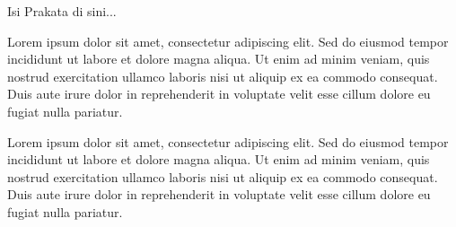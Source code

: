 \documentclass[skripsi,indonesia]{ugmskripsi}
\begin{document}
\cover
\titlepageind
\approvalpage
\declarepage
\motto
\acknowledment

\preface
{}
Isi Prakata di sini...

\tableofcontents
\listoftables
\listoffigures

\abstractind

Lorem ipsum dolor sit amet, consectetur adipiscing elit. Sed do eiusmod tempor incididunt ut labore et dolore magna aliqua. Ut enim ad minim veniam, quis nostrud exercitation ullamco laboris nisi ut aliquip ex ea commodo consequat. Duis aute irure dolor in reprehenderit in voluptate velit esse cillum dolore eu fugiat nulla pariatur.
\endabstractind

\abstracteng

Lorem ipsum dolor sit amet, consectetur adipiscing elit. Sed do eiusmod tempor incididunt ut labore et dolore magna aliqua. Ut enim ad minim veniam, quis nostrud exercitation ullamco laboris nisi ut aliquip ex ea commodo consequat. Duis aute irure dolor in reprehenderit in voluptate velit esse cillum dolore eu fugiat nulla pariatur.
\endabstracteng










\appendix

\end{document}
